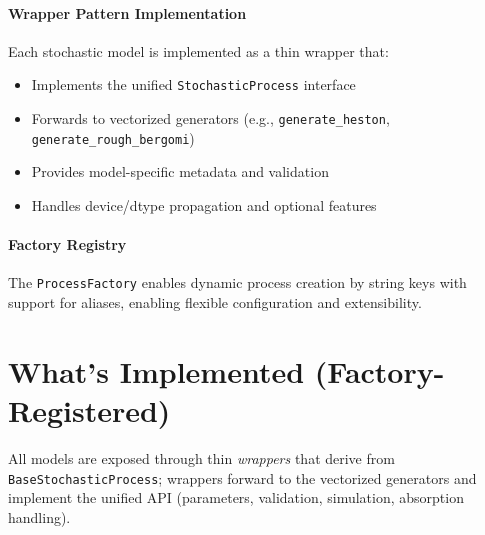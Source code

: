 	\paragraph{Wrapper Pattern Implementation}
	Each stochastic model is implemented as a thin wrapper that:
	\begin{itemize}[nosep]
		\item Implements the unified \texttt{StochasticProcess} interface
		\item Forwards to vectorized generators (e.g., \texttt{generate\_heston}, \texttt{generate\_rough\_bergomi})
		\item Provides model-specific metadata and validation
		\item Handles device/dtype propagation and optional features
	\end{itemize}
	
	\paragraph{Factory Registry}
	The \texttt{ProcessFactory} enables dynamic process creation by string keys with support for aliases, enabling flexible configuration and extensibility.
	
	\section{What's Implemented (Factory-Registered)}
	
	All models are exposed through thin \emph{wrappers} that derive from \texttt{BaseStochasticProcess}; wrappers forward to the vectorized generators and implement the unified API (parameters, validation, simulation, absorption handling).
	
